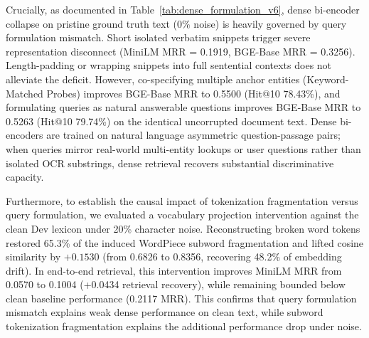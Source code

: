\documentclass[conference]{IEEEtran}
\begin{document}
Crucially, as documented in Table~\ref{tab:dense_formulation_v6}, dense bi-encoder collapse on pristine ground truth text ($0\%$ noise) is heavily governed by query formulation mismatch. Short isolated verbatim snippets trigger severe representation disconnect (MiniLM MRR = 0.1919, BGE-Base MRR = 0.3256). Length-padding or wrapping snippets into full sentential contexts does not alleviate the deficit. However, co-specifying multiple anchor entities (Keyword-Matched Probes) improves BGE-Base MRR to 0.5500 (Hit@10 78.43\%), and formulating queries as natural answerable questions improves BGE-Base MRR to 0.5263 (Hit@10 79.74\%) on the identical uncorrupted document text. Dense bi-encoders are trained on natural language asymmetric question-passage pairs; when queries mirror real-world multi-entity lookups or user questions rather than isolated OCR substrings, dense retrieval recovers substantial discriminative capacity.

Furthermore, to establish the causal impact of tokenization fragmentation versus query formulation, we evaluated a vocabulary projection intervention against the clean Dev lexicon under 20\% character noise. Reconstructing broken word tokens restored 65.3\% of the induced WordPiece subword fragmentation and lifted cosine similarity by $+0.1530$ (from 0.6826 to 0.8356, recovering 48.2\% of embedding drift). In end-to-end retrieval, this intervention improves MiniLM MRR from 0.0570 to 0.1004 (+0.0434 retrieval recovery), while remaining bounded below clean baseline performance (0.2117 MRR). This confirms that query formulation mismatch explains weak dense performance on clean text, while subword tokenization fragmentation explains the additional performance drop under noise.

\begin{table}[t]
\centering\small
\caption{Dense Bi-Encoder Sensitivity to Query Formulation on Clean Ground-Truth Receipt Text ($0\%$ noise, Test $N=306$).}\label{tab:dense_formulation_v6}
\end{table}
\end{document}
